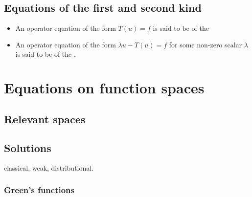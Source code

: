 \subsection{Equations of the first and second kind}
\begin{definition}
\begin{itemize}
\item An operator equation of the form $T(u) = f$ is said to be of the 
\item An operator equation of the form $\lambda u - T(u) = f$ for some non-zero scalar $\lambda$ is said to be of the .
\end{itemize}
\end{definition}

\section{Equations on function spaces}
\subsection{Relevant spaces}

\subsection{Solutions}
classical, weak, distributional.

\subsubsection{Green's functions}


